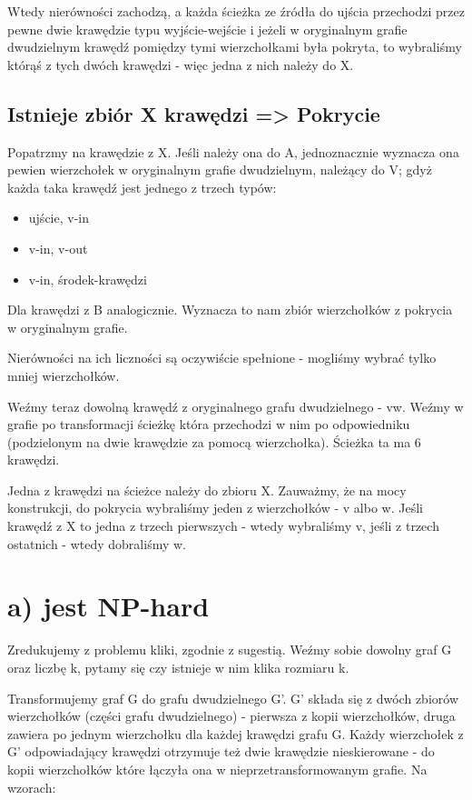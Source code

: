 \documentclass[12pt]{article}
\begin{document}
Wtedy nierówności zachodzą, a każda ścieżka ze źródła do ujścia przechodzi przez pewne dwie krawędzie typu wyjście-wejście i jeżeli w oryginalnym grafie dwudzielnym krawędź pomiędzy tymi wierzchołkami była pokryta, to wybraliśmy którąś z tych dwóch krawędzi - więc jedna z nich należy do X.

\subsection{Istnieje zbiór X krawędzi => Pokrycie}

Popatrzmy na krawędzie z X. Jeśli należy ona do A, jednoznacznie wyznacza ona pewien wierzchołek w oryginalnym grafie dwudzielnym, należący do V; gdyż każda taka krawędź jest jednego z trzech typów:

\begin{itemize}
\item ujście, v-in
\item v-in, v-out
\item v-in, środek-krawędzi
\end{itemize}

Dla krawędzi z B analogicznie. Wyznacza to nam zbiór wierzchołków z pokrycia w oryginalnym grafie.

Nierówności na ich liczności są oczywiście spełnione - mogliśmy wybrać tylko mniej wierzchołków.

Weźmy teraz dowolną krawędź z oryginalnego grafu dwudzielnego - vw. Weźmy w grafie po transformacji ścieżkę która przechodzi w nim po odpowiedniku (podzielonym na dwie krawędzie za pomocą wierzchołka). Ścieżka ta ma 6 krawędzi.

Jedna z krawędzi na ścieżce należy do zbioru X. Zauważmy, że na mocy konstrukcji, do pokrycia wybraliśmy jeden z wierzchołków - v albo w. Jeśli krawędź z X to jedna z trzech pierwszych - wtedy wybraliśmy v, jeśli z trzech ostatnich - wtedy dobraliśmy w.


\section{a) jest NP-hard}

Zredukujemy z problemu kliki, zgodnie z sugestią. Weźmy sobie dowolny graf G oraz liczbę k, pytamy się czy istnieje w nim klika rozmiaru k.

Transformujemy graf G do grafu dwudzielnego G'. G' składa się z dwóch zbiorów wierzchołków (części grafu dwudzielnego) - pierwsza z kopii wierzchołków, druga zawiera po jednym wierzchołku dla każdej krawędzi grafu G. Każdy wierzchołek z G' odpowiadający krawędzi otrzymuje też dwie krawędzie nieskierowane - do kopii wierzchołków które łączyła ona w nieprzetransformowanym grafie. Na wzorach:
\end{document}
